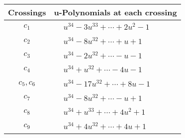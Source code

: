 \documentclass[1p]{elsarticle_modified}
\theoremstyle{definition}
\begin{document}
\begin{tabular}{m{50pt}|m{274pt}}
Crossings & \hspace{64pt}u-Polynomials at each crossing \\
\hline $$\begin{aligned}c_{1}\end{aligned}$$&$\begin{aligned}
&u^{34}-3 u^{33}+\cdots+2 u^2-1
\end{aligned}$\\
\hline $$\begin{aligned}c_{2}\end{aligned}$$&$\begin{aligned}
&u^{34}-8 u^{32}+\cdots+u+1
\end{aligned}$\\
\hline $$\begin{aligned}c_{3}\end{aligned}$$&$\begin{aligned}
&u^{34}-2 u^{32}+\cdots- u-1
\end{aligned}$\\
\hline $$\begin{aligned}c_{4}\end{aligned}$$&$\begin{aligned}
&u^{34}+u^{32}+\cdots-4 u-1
\end{aligned}$\\
\hline $$\begin{aligned}c_{5},c_{6}\end{aligned}$$&$\begin{aligned}
&u^{34}-17 u^{32}+\cdots+8 u-1
\end{aligned}$\\
\hline $$\begin{aligned}c_{7}\end{aligned}$$&$\begin{aligned}
&u^{34}-8 u^{32}+\cdots- u+1
\end{aligned}$\\
\hline $$\begin{aligned}c_{8}\end{aligned}$$&$\begin{aligned}
&u^{34}+u^{33}+\cdots+4 u^2+1
\end{aligned}$\\
\hline $$\begin{aligned}c_{9}\end{aligned}$$&$\begin{aligned}
&u^{34}+4 u^{32}+\cdots+4 u+1
\end{aligned}$\\

\end{tabular}
\end{document}

